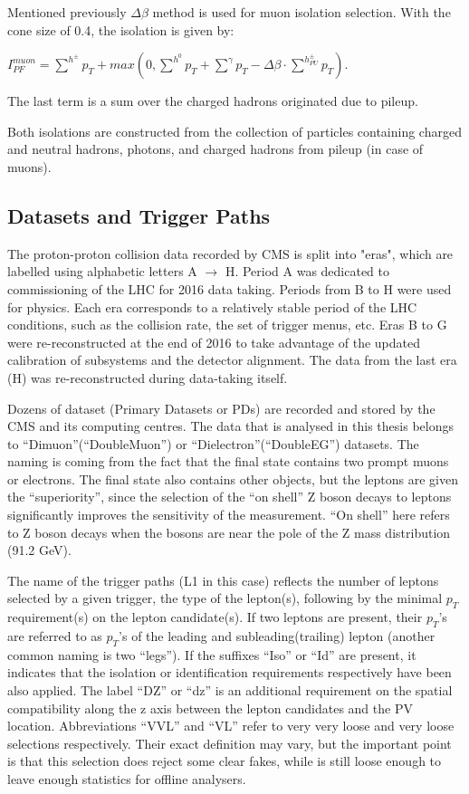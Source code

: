 \begin{small}
Mentioned previously $\Delta \beta$ method is used for muon isolation selection. With the cone size of 0.4, the isolation is given by:

$I^{muon}_{PF} = \sum^{h^\pm} p_T + max (0, \sum^{h^0} p_T + \sum^\gamma p_T - \Delta \beta  \cdot  \sum^{h^\pm_{PU}} p_T)$.

\noindent The last term is a sum over the charged hadrons originated due to pileup.

Both isolations are constructed from the collection of particles containing charged and neutral hadrons, photons, and charged hadrons from pileup (in case of muons).

\subsection{Datasets and Trigger Paths}\label{sec:data_and_trigger}

The proton-proton collision data recorded by CMS is split into "eras", which are labelled using alphabetic letters A $\rightarrow $ H. Period A was dedicated to commissioning of the LHC for 2016 data taking. Periods from B to H were used for physics. Each era corresponds to a relatively stable period of the LHC conditions, such as the collision rate, the set of trigger menus, etc. Eras B to G were re-reconstructed at the end of 2016 to take advantage of the updated calibration of subsystems and the detector alignment. The data from the last era (H) was re-reconstructed during data-taking itself. 

Dozens of dataset (Primary Datasets or PDs) are recorded and stored by the CMS and its computing centres. The data that is analysed in this thesis belongs to ``Dimuon''(``DoubleMuon'') or ``Dielectron''(``DoubleEG'') datasets. The naming is coming from the fact that the final state contains two prompt muons or electrons. The final state also contains other objects, but the leptons are given the ``superiority'', since the selection of the ``on shell'' Z boson decays to leptons significantly improves the sensitivity of the measurement. ``On shell'' here refers to Z boson decays when the bosons are near the pole of the Z mass distribution (91.2 GeV). 

The name of the trigger paths (L1 in this case) reflects the number of leptons selected by a given trigger, the type of the lepton(s), following by the minimal $p_T$ requirement(s) on the lepton candidate(s). If two leptons are present, their $p_T$'s are referred to as $p_T$'s of the leading and subleading(trailing) lepton (another common naming is two ``legs''). If the suffixes ``Iso'' or ``Id'' are present, it indicates that the isolation or identification requirements respectively have been also applied. The label ``DZ'' or ``dz'' is an additional requirement on the spatial compatibility along the z axis between the lepton candidates and the PV location. Abbreviations ``VVL'' and ``VL'' refer to very very loose and very loose selections respectively. Their exact definition may vary, but the important point is that this selection does reject some clear fakes, while is still loose enough to leave enough statistics for offline analysers. 


\end{small}

